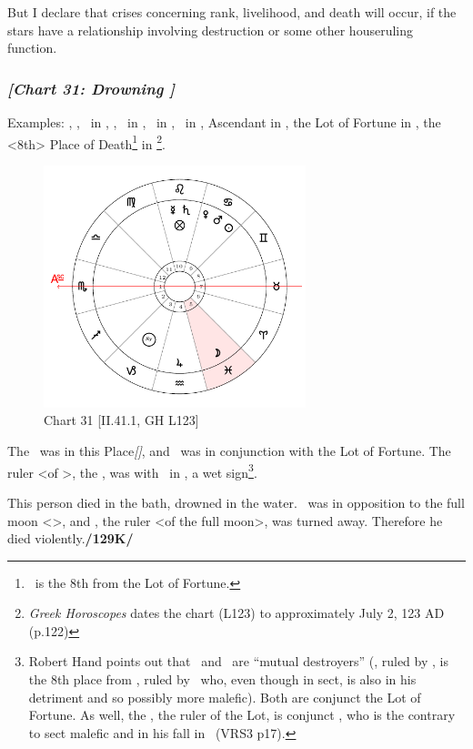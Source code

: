 But I declare that crises concerning rank, livelihood, and death will occur, if the stars have a relationship involving destruction or some other houseruling function.
\newpage
\subsubsection{\textit{[Chart 31: Drowning ]}}
Examples: \Sun, \Mars, \Venus\, in \Cancer, \Saturn, \Mercury\, in \Leo, \Jupiter\, in \Aquarius, \Moon\, in \Pisces, Ascendant in \Scorpio, the Lot of Fortune in \Leo, the <8th> Place of Death\footnote{\Pisces\, is the 8th from the Lot of Fortune.} in \Pisces\footnote{\textit{Greek Horoscopes} dates the chart (L123) to approximately July 2, 123 AD (p.122)}.

\clearpage
\begin{figure}
\centering
\includegraphics[width=0.68\textwidth]{charts/2_41_1}
\caption{Chart 31 [II.41.1, GH L123]}
\label{fig:chart31}
\end{figure} 

The \Moon\, was in this Place\textsl{[\Pisces]}, and \Saturn\, was in conjunction with the Lot of Fortune. The ruler <of \Leo>, the \Sun, was with \Mars\, in \Cancer, a wet sign\footnote{Robert Hand points out that \Mercury\, and \Saturn\, are ``mutual destroyers'' (\Virgo, ruled by \Mercury, is the 8th place from \Capricorn, ruled by \Saturn\, who, even though in sect, is also in his detriment and so possibly more malefic). Both are conjunct the Lot of Fortune. As well, the \Sun, the ruler of the Lot, is conjunct \Mars, who is the contrary to sect malefic and in his fall in \Cancer\, (VRS3 p17).}. 

This person died in the bath, drowned in the water. \Mars\, was in opposition to the full moon <\Capricorn>, and \Saturn, the ruler <of the full moon>, was turned away. Therefore he died violently.\textbf{/129K/}
\newpage
